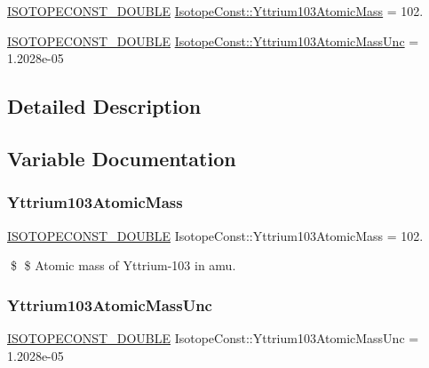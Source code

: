 \begin{DoxyCompactItemize}
\item 
\mbox{\hyperlink{group___isotope_const-_macros_ga8f45a7272ce02c0b4c65c44636ed719a}{I\+S\+O\+T\+O\+P\+E\+C\+O\+N\+S\+T\+\_\+\+D\+O\+U\+B\+LE}} \mbox{\hyperlink{group___isotope_const-_yttrium-_y103_ga3a3ed274a42cf8f034aa31e172a5a70b}{Isotope\+Const\+::\+Yttrium103\+Atomic\+Mass}} = 102.
\item 
\mbox{\hyperlink{group___isotope_const-_macros_ga8f45a7272ce02c0b4c65c44636ed719a}{I\+S\+O\+T\+O\+P\+E\+C\+O\+N\+S\+T\+\_\+\+D\+O\+U\+B\+LE}} \mbox{\hyperlink{group___isotope_const-_yttrium-_y103_gabed9dc9dde5402ddf95be335549dfa0d}{Isotope\+Const\+::\+Yttrium103\+Atomic\+Mass\+Unc}} = 1.\+2028e-\/05
\end{DoxyCompactItemize}


\subsection{Detailed Description}


\subsection{Variable Documentation}
\mbox{\label{group___isotope_const-_yttrium-_y103_ga3a3ed274a42cf8f034aa31e172a5a70b}} 
\subsubsection{\texorpdfstring{Yttrium103\+Atomic\+Mass}{Yttrium103AtomicMass}}
{\footnotesize\ttfamily \mbox{\hyperlink{group___isotope_const-_macros_ga8f45a7272ce02c0b4c65c44636ed719a}{I\+S\+O\+T\+O\+P\+E\+C\+O\+N\+S\+T\+\_\+\+D\+O\+U\+B\+LE}} Isotope\+Const\+::\+Yttrium103\+Atomic\+Mass = 102.}

\$ \$ Atomic mass of Yttrium-\/103 in amu. \mbox{\label{group___isotope_const-_yttrium-_y103_gabed9dc9dde5402ddf95be335549dfa0d}} 
\subsubsection{\texorpdfstring{Yttrium103\+Atomic\+Mass\+Unc}{Yttrium103AtomicMassUnc}}
{\footnotesize\ttfamily \mbox{\hyperlink{group___isotope_const-_macros_ga8f45a7272ce02c0b4c65c44636ed719a}{I\+S\+O\+T\+O\+P\+E\+C\+O\+N\+S\+T\+\_\+\+D\+O\+U\+B\+LE}} Isotope\+Const\+::\+Yttrium103\+Atomic\+Mass\+Unc = 1.\+2028e-\/05}

